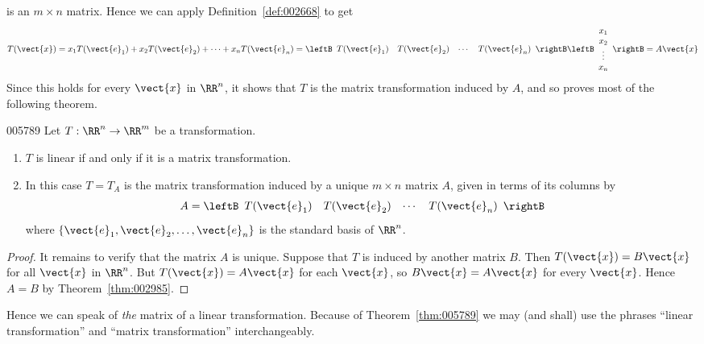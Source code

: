 is an $m \times n$ matrix. Hence we can apply Definition~\ref{def:002668} to get
\begin{equation*}
T(\vect{x}) = x_{1}T(\vect{e}_{1}) + x_{2}T(\vect{e}_{2}) + \cdots + x_{n}T(\vect{e}_{n}) = \leftB \begin{array}{cccc}
T(\vect{e}_{1}) & T(\vect{e}_{2}) & \cdots & T(\vect{e}_{n})
\end{array} \rightB \leftB \begin{array}{c}
x_{1} \\
x_{2} \\
\vdots \\
x_{n}
\end{array} \rightB = A\vect{x}
\end{equation*}
Since this holds for every $\vect{x}$ in $\RR^n$, it shows that $T$ is the matrix transformation induced by $A$, and so proves most of the following theorem.

\begin{theorem}{}{005789}
Let $T : \RR^n \to \RR^m$ be a transformation.

\begin{enumerate}
\item $T$ is linear if and only if it is a matrix transformation.

\item In this case $T = T_{A}$ is the matrix transformation induced by a unique $m \times n$ matrix $A$, given in terms of its columns by
\begin{equation*}
A = \leftB \begin{array}{cccc}
T(\vect{e}_{1}) & T(\vect{e}_{2}) & \cdots & T(\vect{e}_{n})
\end{array} \rightB
\end{equation*}
where $\{\vect{e}_{1}, \vect{e}_{2}, \dots, \vect{e}_{n}\}$ is the standard basis of $\RR^n$.

\end{enumerate}
\end{theorem}

\begin{proof}
It remains to verify that the matrix $A$ is unique. Suppose that $T$ is induced by another matrix $B$. Then $T(\vect{x}) = B\vect{x}$ for all $\vect{x}$ in $\RR^n$. But $T(\vect{x}) = A\vect{x}$ for each $\vect{x}$, so $B\vect{x} = A\vect{x}$ for every $\vect{x}$. Hence $A = B$ by Theorem~\ref{thm:002985}.
\end{proof}

Hence we can speak of \textit{the} matrix of a linear transformation. Because of Theorem~\ref{thm:005789} we may (and shall) use the phrases ``linear transformation'' and ``matrix transformation'' interchangeably.

